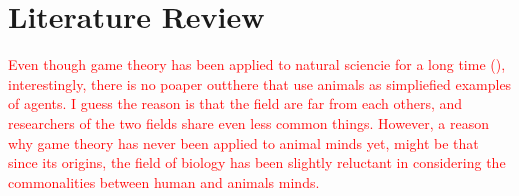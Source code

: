 \newpage
\section*{Literature Review}

\textcolor{red}{Even though game theory has been applied to natural sciencie for a long time (\cite{smithLogicAnimalConflict1973}), interestingly, there is no poaper outthere that use animals as simpliefied examples of agents. I guess the reason is that the field are far from each others, and researchers of the two fields share even less common things. However, a reason why game theory has never been applied to animal minds yet, might be that since its origins, the field of biology has been slightly reluctant in considering the commonalities between human and animals minds.}